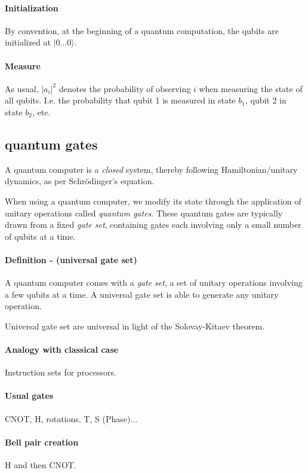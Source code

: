 \documentclass{article}
\begin{document}
\paragraph{Initialization} By convention, at the beginning of a quantum computation, the qubits are initialized at $|0\dots 0\rangle$.

\paragraph{Measure} As usual, $|a_i|^2$ denotes the probability of observing $i$ when measuring the state of all qubits.
I.e. the probability that qubit 1 is measured in state $b_1$, qubit 2 in state $b_2$, etc.

\subsection{quantum gates} 

A quantum computer is a \emph{closed} system, thereby following Hamiltonian/unitary dynamics, as per Schr\"{o}dinger's equation.

When using a quantum computer, we modify its state through the application of unitary operations called \emph{quantum gates}. 
These quantum gates are typically drawn from a fixed \emph{gate set}, containing gates each involving only a small number of qubits at a time.

\paragraph{Definition - (universal gate set)} A quantum computer comes with a \emph{gate set}, a set of unitary operations
involving a few qubits at a time. A universal gate set is able to generate any unitary operation.

Universal gate set are universal in light of the Solovay-Kitaev theorem.

\paragraph{Analogy with classical case} Instruction sets for processors.

\paragraph{Usual gates} CNOT, H, rotations, T, S (Phase)... 

\paragraph{Bell pair creation} H and then CNOT.
\end{document}

